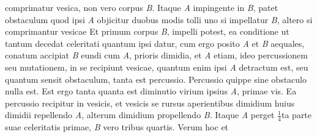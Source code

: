 comprimatur vesica,%
\protect{} non vero 
  {}
corpus \textit{B}. Itaque \textit{A} impingente in \textit{B}, patet %
obstaculum\protect{} quod ipsi \textit{A} objicitur duobus modis tolli
uno si impellatur \textit{B}, altero si comprimantur vesicae%
\protect{} 
%
Et primum corpus \textit{B}, impelli potest, ea conditione
ut tantum decedat celeritati%
\protect{} 
  {}
quantum ipsi datur, cum ergo posito \textit{A} et \textit{B} aequales,
conatum accipiat \textit{B} eundi%
\protect{} cum \textit{A}, 
  {}
prioris dimidia, et \textit{A} etiam, ideo percussionem\protect{} seu mutationem,\protect{} in se recipiunt vesicae,%
\protect{} 
quantum enim ipsi \textit{A} detractum est, seu quantum
sensit obstaculum,%
\protect{} tanta est %
percussio.\protect{} 
\pend
\pstart
Percussio%
\protect{} quippe sine obstaculo%
\protect{} nulla est. Est
ergo 
 tanta quanta est diminutio virium%
\protect{} ipsius \textit{A}, 
%
%
primae vis.
Ea %
percussio\protect{} recipitur in vesicis, et vesicis%
\protect{} se rursus 
aperientibus 
dimidium huius dimidii 
%
%
repellendo \textit{A}, alterum dimidium propellendo \textit{B}. Itaque \textit{A} perget $\frac{1}{4}$ta parte suae celeritatis primae, 
\textit{B} vero tribus quartis. Verum hoc et 
  {}

